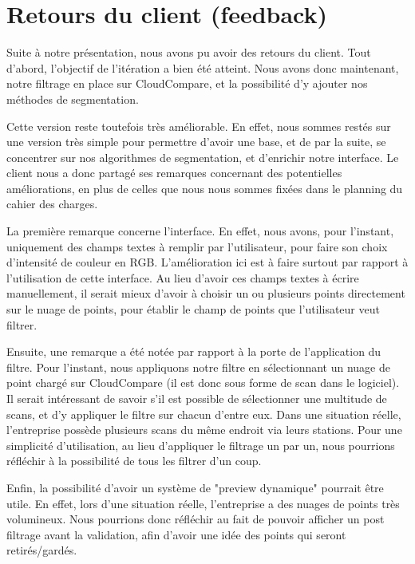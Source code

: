 \documentclass[12pt,titlepage,french]{article}
\begin{document}
\section{Retours du client (feedback)}

Suite à notre présentation, nous avons pu avoir des retours du client. Tout d'abord, l'objectif de l'itération a bien été atteint. Nous avons donc maintenant, notre filtrage en place sur CloudCompare, et la possibilité d'y ajouter nos méthodes de segmentation.

Cette version reste toutefois très améliorable. En effet, nous sommes restés sur une version très simple pour permettre d'avoir une base, et de par la suite, se concentrer sur nos algorithmes de segmentation, et d'enrichir notre interface. Le client nous a donc partagé ses remarques concernant des potentielles améliorations, en plus de celles que nous nous sommes fixées dans le planning du cahier des charges.

La première remarque concerne l'interface. En effet, nous avons, pour l'instant, uniquement des champs textes à remplir par l'utilisateur, pour faire son choix d'intensité de couleur en RGB. L'amélioration ici est à faire surtout par rapport à l'utilisation de cette interface. Au lieu d'avoir ces champs textes à écrire manuellement, il serait mieux d'avoir à choisir un ou plusieurs points directement sur le nuage de points, pour établir le champ de points que l'utilisateur veut filtrer.

Ensuite, une remarque a été notée par rapport à la porte de l'application du filtre. Pour l'instant, nous appliquons notre filtre en sélectionnant un nuage de point chargé sur CloudCompare (il est donc sous forme de scan dans le logiciel). Il serait intéressant de savoir s'il est possible de sélectionner une multitude de scans, et d'y appliquer le filtre sur chacun d'entre eux. Dans une situation réelle, l'entreprise possède plusieurs scans du même endroit via leurs stations. Pour une simplicité d'utilisation, au lieu d'appliquer le filtrage un par un, nous pourrions réfléchir à la possibilité de tous les filtrer d'un coup.

Enfin, la possibilité d'avoir un système de "preview dynamique" pourrait être utile. En effet, lors d'une situation réelle, l'entreprise a des nuages de points très volumineux. Nous pourrions donc réfléchir au fait de pouvoir afficher un post filtrage avant la validation, afin d'avoir une idée des points qui seront retirés/gardés.\\
\end{document}

